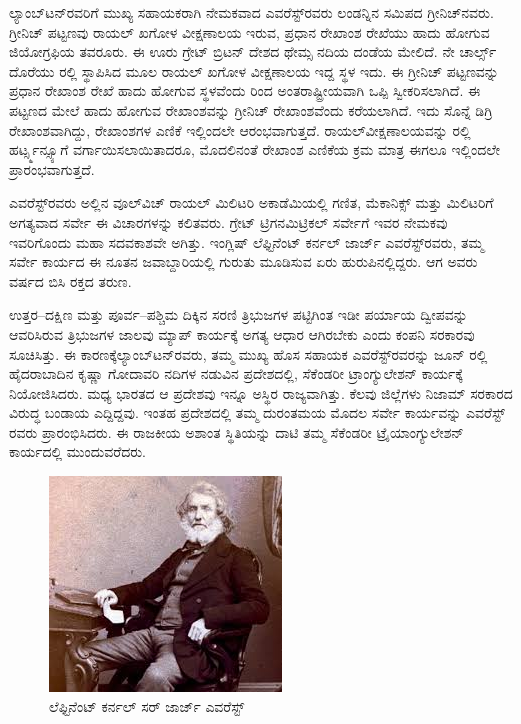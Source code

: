 ಲ್ಯಾಂಬ್​ಟನ್​ರವರಿಗೆ ಮುಖ್ಯ ಸಹಾಯಕರಾಗಿ ನೇಮಕವಾದ ಎವರೆಸ್ಟ್​ರವರು ಲಂಡನ್ನಿನ ಸಮಿಪದ ಗ್ರೀನಿಚ್​ನವರು. ಗ್ರೀನಿಚ್​ ಪಟ್ಟಣವು ರಾಯಲ್​ ಖಗೋಳ ವೀಕ್ಷಣಾಲಯ ಇರುವ, ಪ್ರಧಾನ ರೇಖಾಂಶ ರೇಖೆಯು ಹಾದು ಹೋಗುವ ಜಿಯೋಗ್ರಫಿಯ ತವರೂರು. ಈ ಊರು ಗ್ರೇಟ್​ ಬ್ರಿಟನ್​ ದೇಶದ ಥೇಮ್ಸ ನದಿಯ ದಂಡೆಯ ಮೇಲಿದೆ. ನೇ ಚಾರ್ಲ್ಸ್ ದೊರೆಯು ರಲ್ಲಿ ಸ್ಥಾಪಿಸಿದ ಮೂಲ ರಾಯಲ್​ ಖಗೋಳ ವೀಕ್ಷಣಾಲಯ ಇದ್ದ ಸ್ಥಳ ಇದು. ಈ ಗ್ರೀನಿಚ್​ ಪಟ್ಟಣವನ್ನು ಪ್ರಧಾನ ರೇಖಾಂಶ ರೇಖೆ ಹಾದು ಹೋಗುವ ಸ್ಥಳವೆಂದು  ರಿಂದ ಅಂತರಾಷ್ಟ್ರೀಯವಾಗಿ ಒಪ್ಪಿ ಸ್ವೀಕರಿಸಲಾಗಿದೆ. ಈ ಪಟ್ಟಣದ ಮೇಲೆ ಹಾದು ಹೋಗುವ ರೇಖಾಂಶವನ್ನು ಗ್ರೀನಿಚ್​ ರೇಖಾಂಶವೆಂದು ಕರೆಯಲಾಗಿದೆ. ಇದು ಸೊನ್ನೆ ಡಿಗ್ರಿ ರೇಖಾಂಶವಾಗಿದ್ದು, ರೇಖಾಂಶಗಳ ಎಣಿಕೆ ಇಲ್ಲಿಂದಲೇ ಆರಂಭವಾಗುತ್ತದೆ. ರಾಯಲ್​\break ವೀಕ್ಷಣಾಲಯವನ್ನು ರಲ್ಲಿ ಹರ್ಟ್ಸ್ಮನ್ಸ್ಯೂಗೆ ವರ್ಗಾಯಿಸಲಾಯಿತಾದರೂ, ಮೊದಲಿನಂತೆ ರೇಖಾಂಶ ಎಣಿಕೆಯ ಕ್ರಮ ಮಾತ್ರ ಈಗಲೂ ಇಲ್ಲಿಂದಲೇ ಪ್ರಾರಂಭವಾಗುತ್ತದೆ.

ಎವರೆಸ್ಟ್​ರವರು ಅಲ್ಲಿನ ವೂಲ್​ವಿಚ್​ ರಾಯಲ್​ ಮಿಲಿಟರಿ ಅಕಾಡೆಮಿಯಲ್ಲಿ ಗಣಿತ, ಮೆಕಾನಿಕ್ಸ್​ ಮತ್ತು ಮಿಲಿಟರಿಗೆ ಅಗತ್ಯವಾದ ಸರ್ವೇ ಈ ವಿಚಾರಗಳನ್ನು ಕಲಿತವರು. ಗ್ರೇಟ್​ ಟ್ರಿಗನಮಿಟ್ರಿಕಲ್​ ಸರ್ವೇಗೆ ಇವರ ನೇಮಕವು ಇವರಿಗೊಂದು ಮಹಾ ಸದವಕಾಶವೇ ಅಗಿತ್ತು. ಇಂಗ್ಲಿಷ್​ ಲೆಫ್ಟಿನೆಂಟ್​ ಕರ್ನಲ್​ ಜಾರ್ಜ್ ಎವರೆಸ್ಟ್​ರವರು, ತಮ್ಮ ಸರ್ವೇ ಕಾರ್ಯದ ಈ ನೂತನ ಜವಾಬ್ದಾರಿಯಲ್ಲಿ ಗುರುತು ಮೂಡಿಸುವ ಏರು ಹುರುಪಿನಲ್ಲಿದ್ದರು. ಆಗ ಅವರು  ವರ್ಷದ ಬಿಸಿ ರಕ್ತದ ತರುಣ.

ಉತ್ತರ–ದಕ್ಷಿಣ ಮತ್ತು ಪೂರ್ವ–ಪಶ್ಚಿಮ ದಿಕ್ಕಿನ ಸರಣಿ ತ್ರಿಭುಜಗಳ ಪಟ್ಟಿಗಿಂತ ಇಡೀ ಪರ್ಯಾಯ ದ್ವೀಪವನ್ನು ಆವರಿಸಿರುವ ತ್ರಿಭುಜಗಳ ಜಾಲವು ಮ್ಯಾಪ್​ ಕಾರ್ಯಕ್ಕೆ ಅಗತ್ಯ ಆಧಾರ ಆಗಿರಬೇಕು ಎಂದು ಕಂಪನಿ ಸರಕಾರವು ಸೂಚಿಸಿತ್ತು. ಈ ಕಾರಣಕ್ಕೆ\break ಲ್ಯಾಂಬ್​ಟನ್​ರವರು, ತಮ್ಮ ಮುಖ್ಯ ಹೊಸ ಸಹಾಯಕ ಎವರೆಸ್ಟ್​ರವರನ್ನು ಜೂನ್​  ರಲ್ಲಿ ಹೈದರಾಬಾದಿನ ಕೃಷ್ಣಾ ಗೋದಾವರಿ ನದಿಗಳ ನಡುವಿನ ಪ್ರದೇಶದಲ್ಲಿ, ಸೆಕೆಂಡರೀ ಟ್ರಾಂಗ್ಯುಲೇಶನ್​ ಕಾರ್ಯಕ್ಕೆ ನಿಯೋಜಿಸಿದರು. ಮಧ್ಯ ಭಾರತದ ಆ ಪ್ರದೇಶವು ಇನ್ನೂ ಅಸ್ಥಿರ ರಾಜ್ಯವಾಗಿತ್ತು. ಕೆಲವು ಜಿಲ್ಲೆಗಳು ನಿಜಾಮ್ ಸರಕಾರದ ವಿರುದ್ಧ ಬಂಡಾಯ ಎದ್ದಿದ್ದವು. ಇಂತಹ ಪ್ರದೇಶದಲ್ಲಿ ತಮ್ಮ ದುರಂತಮಯ ಮೊದಲ ಸರ್ವೇ ಕಾರ್ಯವನ್ನು ಎವರೆಸ್ಟ್​ರವರು ಪ್ರಾರಂಭಿಸಿದರು. ಈ ರಾಜಕೀಯ ಅಶಾಂತ ಸ್ಥಿತಿಯನ್ನು ದಾಟಿ ತಮ್ಮ ಸೆಕೆಂಡರೀ ಟ್ರೈಯಾಂಗ್ಯುಲೇಶನ್​ ಕಾರ್ಯದಲ್ಲಿ ಮುಂದುವರೆದರು.

\begin{figure}
\includegraphics[scale=0.6]{"images/image012.jpg"}
\caption{ಲೆಫ್ಟಿನೆಂಟ್​ ಕರ್ನಲ್​ ಸರ್​ ಜಾರ್ಜ್ ಎವರೆಸ್ಟ್​}\label{chap8-fig1}
\end{figure}

